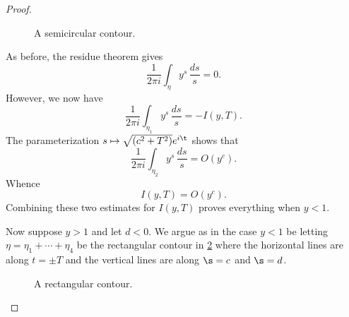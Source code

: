 \documentclass[12pt]{article}
\begin{document}
\begin{proof}
\begin{figure}[h]
          \caption{A semicircular contour.}
          \label{fig:discontinuous_integral_contour_2}
        \end{figure}

        \noindent As before, the residue theorem gives
        \[
          \frac{1}{2\pi i}\int_{\eta}y^{s}\,\frac{ds}{s} = 0.
        \]
        However, we now have
        \[
          \frac{1}{2\pi i}\int_{\eta_{1}}y^{s}\,\frac{ds}{s} = -I(y,T).
        \]
        The parameterization \(s \mapsto \sqrt{(c^{2}+T^{2})}e^{i\t}\) shows that
        \[
          \frac{1}{2\pi i}\int_{\eta_{2}}y^{s}\,\frac{ds}{s} = O(y^{c}).
        \]
        Whence
        \[
          I(y,T) = O(y^{c}).
        \]
        Combining these two estimates for \(I(y,T)\) proves everything when \(y < 1\).
        
        Now suppose \(y > 1\) and let \(d < 0\). We argue as in the case \(y < 1\) be letting \(\eta = \eta_{1}+\cdots+\eta_{4}\) be the rectangular contour in \cref{fig:discontinuous_integral_contour_3} where the horizontal lines are along \(t = \pm T\) and the vertical lines are along \(\s = c\) and \(\s = d\).

        \begin{figure}[ht]
          \centering
          \caption{A rectangular contour.}
          \label{fig:discontinuous_integral_contour_3}
        \end{figure}


\end{proof}
\end{document}
